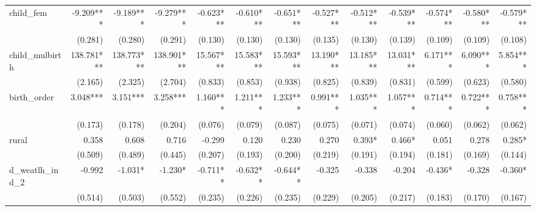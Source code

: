 \begin{tabular}{lrrrrrrrrrrrr}
child\_fem                                  &    -9.209*** &    -9.189*** &    -9.279*** &    -0.623*** &    -0.610*** &    -0.651*** &    -0.527*** &    -0.512*** &    -0.539*** &    -0.574*** &    -0.580*** &    -0.579*** \\ 
                                            &      (0.281) &      (0.280) &      (0.291) &      (0.130) &      (0.130) &      (0.130) &      (0.135) &      (0.130) &      (0.139) &      (0.109) &      (0.109) &      (0.108) \\ 
child\_mulbirth                             &   138.781*** &   138.773*** &   138.901*** &    15.567*** &    15.583*** &    15.593*** &    13.190*** &    13.185*** &    13.031*** &     6.171*** &     6.090*** &     5.854*** \\ 
                                            &      (2.165) &      (2.325) &      (2.704) &      (0.833) &      (0.853) &      (0.938) &      (0.825) &      (0.839) &      (0.831) &      (0.599) &      (0.623) &      (0.580) \\ 
birth\_order                                &     3.048*** &     3.151*** &     3.258*** &     1.160*** &     1.211*** &     1.233*** &     0.991*** &     1.035*** &     1.057*** &     0.714*** &     0.722*** &     0.758*** \\ 
                                            &      (0.173) &      (0.178) &      (0.204) &      (0.076) &      (0.079) &      (0.087) &      (0.075) &      (0.071) &      (0.074) &      (0.060) &      (0.062) &      (0.062) \\ 
rural                                       &        0.358 &        0.608 &        0.716 &       -0.299 &        0.120 &        0.230 &        0.270 &       0.393* &       0.466* &        0.051 &        0.278 &       0.285* \\ 
                                            &      (0.509) &      (0.489) &      (0.445) &      (0.207) &      (0.193) &      (0.200) &      (0.219) &      (0.191) &      (0.194) &      (0.181) &      (0.169) &      (0.144) \\ 
d\_weatlh\_ind\_2                           &       -0.992 &      -1.031* &      -1.230* &     -0.711** &     -0.632** &     -0.644** &       -0.325 &       -0.338 &       -0.204 &      -0.436* &       -0.328 &      -0.360* \\ 
                                            &      (0.514) &      (0.503) &      (0.552) &      (0.235) &      (0.226) &      (0.235) &      (0.229) &      (0.205) &      (0.217) &      (0.183) &      (0.170) &      (0.167) \\ 

\end{tabular}
